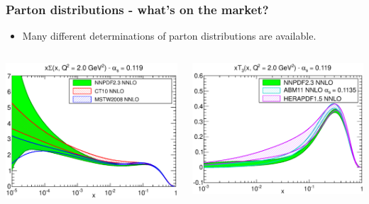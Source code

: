\documentclass[10pt]{beamer}
\begin{document}
\begin{frame}
\frametitle{Parton distributions - what's on the market?}

\begin{itemize}
\item Many different determinations of parton distributions are available.
\end{itemize}

\begin{columns}
	\begin{column}{0.5\textwidth}
		\includegraphics[width=\textwidth]{pdf_xSigma_log_band_comparison_others.eps}
	\end{column}

	\begin{column}{0.5\textwidth}
		\includegraphics[width=\textwidth]{pdf_xT3_log_band_comparison_others_b.eps}
	\end{column}
\end{columns}


\end{frame}
\end{document}
